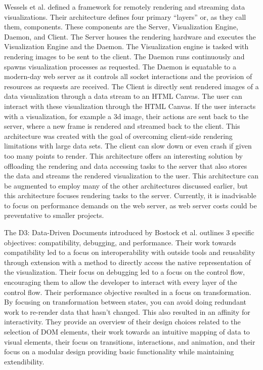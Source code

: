 Wessels et al. \cite{remotevis} defined a framework for remotely rendering and streaming data visualizations.  Their architecture defines four primary “layers” or, as they call them, components.  These components are the Server, Visualization Engine, Daemon, and Client.  The Server houses the rendering hardware and executes the Visualization Engine and the Daemon.  The Visualization engine is tasked with rendering images to be sent to the client.  The Daemon runs continuously and spawns visualization processes as requested.  The Daemon is equatable to a modern-day web server as it controls all socket interactions and the provision of resources as requests are received.  The Client is directly sent rendered images of a data visualization through a data stream to an HTML Canvas.  The user can interact with these visualization through the HTML Canvas.  If the user interacts with a visualization, for example a 3d image, their actions are sent back to the server, where a new frame is rendered and streamed back to the client.  This architecture was created with the goal of overcoming client-side rendering limitations with large data sets.  The client can slow down or even crash if given too many points to render.  This architecture offers an interesting solution by offloading the rendering and data accessing tasks to the server that also stores the data and streams the rendered visualization to the user.  This architecture can be augmented to employ many of the other architectures discussed earlier, but this architecture focuses rendering tasks to the server. Currently, it is inadvisable to focus on performance demands on the web server, as web server costs could be preventative to smaller projects. \par
The D3: Data-Driven Documents introduced by Bostock et al. \cite{d3} outlines 3 specific objectives: compatibility, debugging, and performance.  Their work towards compatibility led to a focus on interoperability with outside tools and reusability through extension with a method to directly access the native representation of the visualization.  Their focus on debugging led to a focus on the control flow, encouraging them to allow the developer to interact with every layer of the control flow.  Their performance objective resulted in a focus on transformation.  By focusing on transformation between states, you can avoid doing redundant work to re-render data that hasn’t changed.  This also resulted in an affinity for interactivity.  They provide an overview of their design choices related to the selection of DOM elements, their work towards an intuitive mapping of data to visual elements, their focus on transitions, interactions, and animation, and their focus on a modular design providing basic functionality while maintaining extendibility. \par
